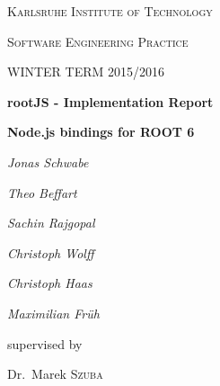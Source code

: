 \begin{titlepage}
	\centering
	{\scshape\LARGE Karlsruhe Institute of Technology \par}
	\vspace{1cm}
	{\scshape\Large Software Engineering Practice\par}
	\vspace{0.5cm}
	{\scshape\Large WINTER TERM 2015/2016\par}
	\vspace{1.5cm}
	{\Huge\bfseries rootJS - Implementation Report\par}
	\vspace{0.25cm}
	{\Large\bfseries Node.js bindings for ROOT 6\par}
	\vspace{2cm}
	{\Large\itshape Jonas Schwabe\par}
	{\Large\itshape Theo Beffart\par}
	{\Large\itshape Sachin Rajgopal\par}
	{\Large\itshape Christoph Wolff\par}
	{\Large\itshape Christoph Haas\par}

	{\Large\itshape Maximilian Fr\"uh\par}
	\vfill
	supervised by\par
	Dr.~Marek \textsc{Szuba}

	\vfill

	{\large \date{99.99.9999}\par}
\end{titlepage}
